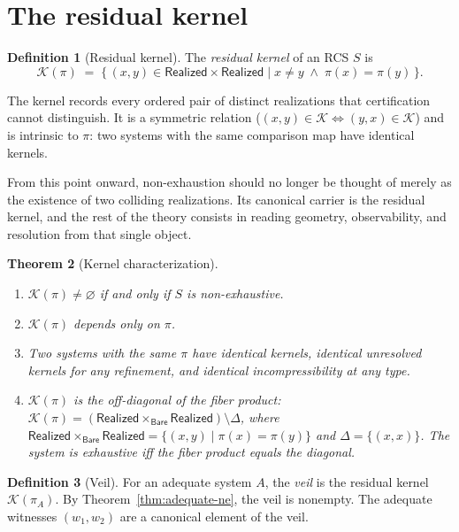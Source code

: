 \documentclass[11pt,a4paper]{article}
\theoremstyle{plain}
\newtheorem{theorem}{Theorem}[section]
\theoremstyle{definition}
\newtheorem{definition}[theorem]{Definition}
\theoremstyle{remark}
\newcommand{\Bare}{\mathsf{Bare}}
\newcommand{\Real}{\mathsf{Realized}}
\newcommand{\compare}{\pi}
\newcommand{\Ker}{\mathcal{K}}
\begin{document}
\section{The residual kernel}\label{sec:kernel}

\begin{definition}[Residual kernel]\label{def:kernel}
The \emph{residual kernel} of an RCS $S$ is
\[
  \Ker(\compare) \;=\; \bigl\{\,(x,y) \in \Real \times \Real
    \;\big|\; x \neq y \;\land\; \compare(x) = \compare(y)\,\bigr\}.
\]
\end{definition}

The kernel records every ordered pair of distinct realizations that
certification cannot distinguish. It is a symmetric relation
($(x,y) \in \Ker \Leftrightarrow (y,x) \in \Ker$) and is intrinsic to
$\compare$: two systems with the same comparison map have identical kernels.

From this point onward, non-exhaustion should no longer be thought of merely
as the existence of two colliding realizations. Its canonical carrier is the
residual kernel, and the rest of the theory consists in reading geometry,
observability, and resolution from that single object.

\begin{theorem}[Kernel characterization]\label{thm:kernel-char}
\leavevmode
\begin{enumerate}[label=(\roman*),nosep]
\item $\Ker(\compare) \neq \varnothing$ if and only if $S$ is non-exhaustive.
\item $\Ker(\compare)$ depends only on $\compare$.
\item Two systems with the same $\compare$ have identical kernels, identical
      unresolved kernels for any refinement, and identical incompressibility
      at any type.
\item $\Ker(\compare)$ is the off-diagonal of the fiber product:
      $\Ker(\compare) = (\Real \times_\Bare \Real) \setminus \Delta$,
      where $\Real \times_\Bare \Real = \{(x,y) \mid \compare(x) = \compare(y)\}$
      and $\Delta = \{(x,x)\}$. The system is exhaustive iff the fiber product
      equals the diagonal.
\end{enumerate}
\end{theorem}

\begin{definition}[Veil]\label{def:veil}
For an adequate system $A$, the \emph{veil} is the residual kernel
$\Ker(\compare_A)$. By Theorem~\ref{thm:adequate-ne}, the veil is nonempty.
The adequate witnesses $(w_1, w_2)$ are a canonical element of the veil.
\end{definition}
\end{document}
